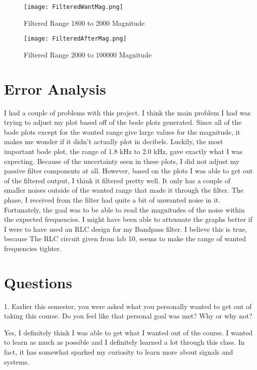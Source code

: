 \documentclass[12pt]{report}
\begin{document}
\begin{figure}[H]
\begin{center}
\caption{Filtered Range 1800 to 2000 Magnitude}
\texttt{[image: FilteredWantMag.png]}
\end{center}
\end{figure}

\begin{figure}[H]
\begin{center}
\caption{Filtered Range 2000 to 100000 Magnitude}
\texttt{[image: FilteredAfterMag.png]}
\end{center}
\end{figure}

\section{Error Analysis}
I had a couple of problems with this project. I think the
main problem I had was trying to adjust my plot based off
of the bode plots generated. Since all of the bode plots
except for the wanted range give large values for the
magnitude, it makes me wonder if it didn't actually
plot in decibels. Luckily, the most important bode plot,
the range of 1.8 kHz to 2.0 kHz, gave exactly what I was
expecting. Because of the uncertainty seen in these
plots, I did not adjust my passive filter components at
all. However, based on the plots I was able to get out of the
filtered output, I think it filtered pretty well. It only
has a couple of smaller noises outside of the wanted range
that made it through the filter. The phase, I received
from the filter had quite a bit of unwanted noise in it.
Fortunately, the goal was to be able to read the 
magnitudes of the noise within the expected frequencies.
I might have been able to attenuate the graphs better if
I were to have used an RLC design for my Bandpass filter.
I believe this is true, because The RLC circuit given from
lab 10, seems to make the range of wanted frequencies
tighter.

\section{Questions}
1. Earlier this semester, you were asked what you personally wanted to get out of taking this
course. Do you feel like that personal goal was met? Why or why not?

Yes, I definitely think I was able to get what I wanted
out of the course. I wanted to learn as much as possible
and I definitely learned a lot through this class. In 
fact, it has somewhat sparked my curiosity to learn
more about signals and systems.
\end{document}
